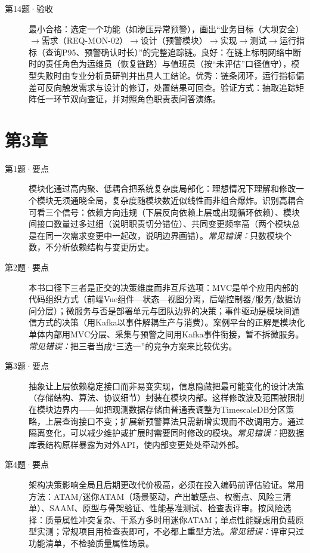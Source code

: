 \begin{description}
\item[第14题·验收] 最小合格：选定一个功能（如渗压异常预警），画出“业务目标（大坝安全）$\rightarrow$需求（REQ-MON-02）$\rightarrow$设计（预警模块）$\rightarrow$实现$\rightarrow$测试$\rightarrow$运行指标（查询P95、预警确认时长）”的完整追踪链。良好：在链上标明网络中断时的责任角色为运维员（恢复链路）与值班员（按“未评估”口径值守），模型失败时由专业分析员研判并出具人工结论。优秀：链条闭环，运行指标偏差可反向触发需求与设计的修订，处置结果可回查。验证方式：抽取追踪矩阵任一环节双向查证，并对照角色职责表问答演练。
\end{description}

\section{第3章}
\begin{description}
\item[第1题·要点] 模块化通过高内聚、低耦合把系统复杂度局部化：理想情况下理解和修改一个模块无须通晓全局，复杂度随模块数近似线性而非组合爆炸。识别高耦合可看三个信号：依赖方向违规（下层反向依赖上层或出现循环依赖）、模块间接口数量过多过细（说明职责切分错位）、共同变更频率高（两个模块总是在同一次需求变更中一起改，说明边界画错）。\textit{常见错误：}只数模块个数，不分析依赖结构与变更历史。
\item[第2题·要点] 本书口径下三者是正交的决策维度而非互斥选项：MVC是单个应用内部的代码组织方式（前端Vue组件—状态—视图分离，后端控制器/服务/数据访问分层）；微服务与否是部署单元与团队边界的决策；事件驱动是模块间通信方式的决策（用Kafka以事件解耦生产与消费）。案例平台的正解是模块化单体内部用MVC分层、采集与预警之间用Kafka事件衔接，暂不拆微服务。\textit{常见错误：}把三者当成“三选一”的竞争方案来比较优劣。
\item[第3题·要点] 抽象让上层依赖稳定接口而非易变实现，信息隐藏把最可能变化的设计决策（存储结构、算法、协议细节）封装在模块内部。这样修改波及范围被限制在模块边界内——如把观测数据存储由普通表调整为TimescaleDB分区策略，上层查询接口不变；扩展新预警算法只需新增实现而不改调用方。通过隔离变化，可以减少维护或扩展时需要同时修改的模块。\textit{常见错误：}把数据库表结构原样暴露为对外API，使内部变更处处牵动外部。
\item[第4题·要点] 架构决策影响全局且后期更改代价极高，必须在投入编码前评估验证。常用方法：ATAM/迷你ATAM（场景驱动，产出敏感点、权衡点、风险三清单）、SAAM、原型与骨架验证、性能基准测试、检查表评审。按风险选择：质量属性冲突复杂、干系方多时用迷你ATAM；单点性能疑虑用负载原型实测；常规项目用检查表即可，不必都上重型方法。\textit{常见错误：}评审只过功能清单，不检验质量属性场景。

\end{description}
